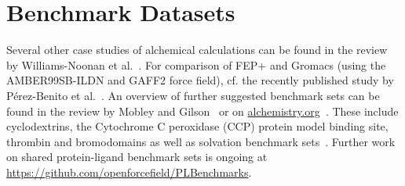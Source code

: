 \documentclass[9pt,bestpractices]{livecoms}
\begin{document}
\section{Benchmark Datasets}
Several other case studies of alchemical calculations can be found in the review by Williams-Noonan et al.~\cite{williams-noonan2018free}. For comparison of FEP+ and Gromacs (using the AMBER99SB-ILDN and GAFF2 force field), cf. the recently published study by Pérez-Benito et al.~\cite{perez-benito2019predicting}.
An overview of further suggested benchmark sets can be found in the review by Mobley and Gilson~\cite{mobley2017predicting} or on \url{alchemistry.org}~\cite{alchemistry}. These include cyclodextrins, the Cytochrome C peroxidase (CCP) protein model binding site, thrombin and bromodomains as well as solvation benchmark sets~\cite{paliwal2011benchmark}. Further work on shared protein-ligand benchmark sets is ongoing at \url{https://github.com/openforcefield/PLBenchmarks}.
\label{sec:benchmark}
\vspace{5mm}
\end{document}
